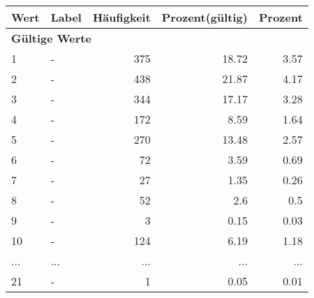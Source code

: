      \begin{longtable}{lXrrr}
     \toprule
     \textbf{Wert} & \textbf{Label} & \textbf{Häufigkeit} & \textbf{Prozent(gültig)} & \textbf{Prozent} \\
     \endhead
     \midrule
     \multicolumn{5}{l}{\textbf{Gültige Werte}}\\
        1 & \multicolumn{1}{X}{-} & %
          \num{375} &
          \num[round-mode=places,round-precision=2]{18,72} &
          \num[round-mode=places,round-precision=2]{3,57} \\
        2 & \multicolumn{1}{X}{-} & %
          \num{438} &
          \num[round-mode=places,round-precision=2]{21,87} &
          \num[round-mode=places,round-precision=2]{4,17} \\
        3 & \multicolumn{1}{X}{-} & %
          \num{344} &
          \num[round-mode=places,round-precision=2]{17,17} &
          \num[round-mode=places,round-precision=2]{3,28} \\
        4 & \multicolumn{1}{X}{-} & %
          \num{172} &
          \num[round-mode=places,round-precision=2]{8,59} &
          \num[round-mode=places,round-precision=2]{1,64} \\
        5 & \multicolumn{1}{X}{-} & %
          \num{270} &
          \num[round-mode=places,round-precision=2]{13,48} &
          \num[round-mode=places,round-precision=2]{2,57} \\
        6 & \multicolumn{1}{X}{-} & %
          \num{72} &
          \num[round-mode=places,round-precision=2]{3,59} &
          \num[round-mode=places,round-precision=2]{0,69} \\
        7 & \multicolumn{1}{X}{-} & %
          \num{27} &
          \num[round-mode=places,round-precision=2]{1,35} &
          \num[round-mode=places,round-precision=2]{0,26} \\
        8 & \multicolumn{1}{X}{-} & %
          \num{52} &
          \num[round-mode=places,round-precision=2]{2,6} &
          \num[round-mode=places,round-precision=2]{0,5} \\
        9 & \multicolumn{1}{X}{-} & %
          \num{3} &
          \num[round-mode=places,round-precision=2]{0,15} &
          \num[round-mode=places,round-precision=2]{0,03} \\
        10 & \multicolumn{1}{X}{-} & %
          \num{124} &
          \num[round-mode=places,round-precision=2]{6,19} &
          \num[round-mode=places,round-precision=2]{1,18} \\
       ... & ... & ... & ... & ... \\
        21 & \multicolumn{1}{X}{-} & %
          \num{1} &
          \num[round-mode=places,round-precision=2]{0,05} &
          \num[round-mode=places,round-precision=2]{0,01} \\


\end{longtable}
